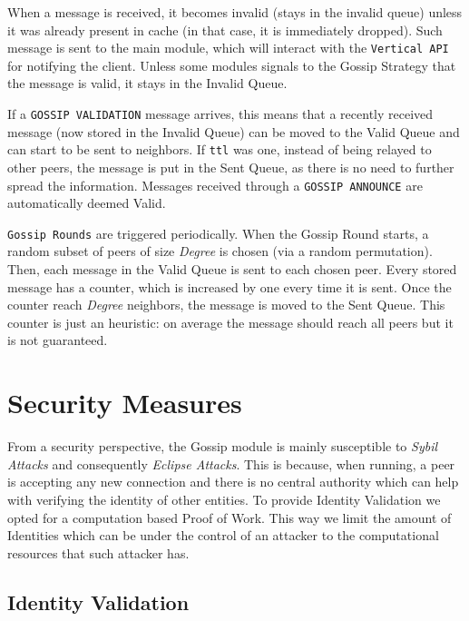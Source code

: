 \documentclass[a4paper,english,10pt,NET]{tumarticle}
\begin{document}
When a message is received, it becomes invalid (stays in the invalid queue) unless it was already present in cache (in that case, it is immediately dropped). Such message is sent to the main module, which will interact with the \texttt{Vertical API} for notifying the client. Unless some modules signals to the Gossip Strategy that the message is valid, it stays in the Invalid Queue.

If a \texttt{GOSSIP VALIDATION} message arrives, this means that a recently received message (now stored in the Invalid Queue) can be moved to the Valid Queue and can start to be sent to neighbors. If \texttt{ttl} was one, instead of being relayed to other peers, the message is put in the Sent Queue, as there is no need to further spread the information. Messages received through a \texttt{GOSSIP ANNOUNCE} are automatically deemed Valid.

\texttt{Gossip Rounds} are triggered periodically. When the Gossip Round starts, a random subset of peers of size \textit{Degree} is chosen (via a random permutation). Then, each message in the Valid Queue is sent to each chosen peer. Every stored message has a counter, which is increased by one every time it is sent. Once the counter reach \textit{Degree} neighbors, the message is moved to the Sent Queue. This counter is just an heuristic: on average the message should reach all peers but it is not guaranteed. 


\section{Security Measures} \label{sec:security}




From a security perspective, the Gossip module is mainly susceptible to \textit{Sybil Attacks} and consequently \textit{Eclipse Attacks}. This is because, when running, a peer is accepting any new connection and there is no central authority which can help with verifying the identity of other entities. To provide Identity Validation we opted for a computation based Proof of Work. This way we limit the amount of Identities which can be under the control of an attacker to the computational resources that such attacker has. 

\subsection{Identity Validation}
\end{document}

